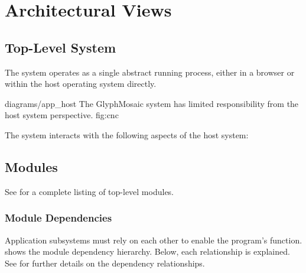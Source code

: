 \section{Architectural Views}
\label{sec:views}
\subsection{Top-Level System}
The system operates as a single abstract running process, either in a browser or within the host operating system directly.

\sidiagram
{diagrams/app_host}
{The GlyphMosaic system has limited responsibility from the host system perspective.}
{fig:cnc}
{\diagsize}

The system interacts with the following aspects of the host system:
\begin{itemize}
\end{itemize}


\subsection{Modules}
\label{sec:modules}
See  for a complete listing of top-level modules.


\subsubsection{Module Dependencies}
\label{sec:moddep}
Application subsystems must rely on each other to enable the program's function.
 shows the module dependency hierarchy.
Below, each relationship is explained.
See  for further details on the dependency relationships.

